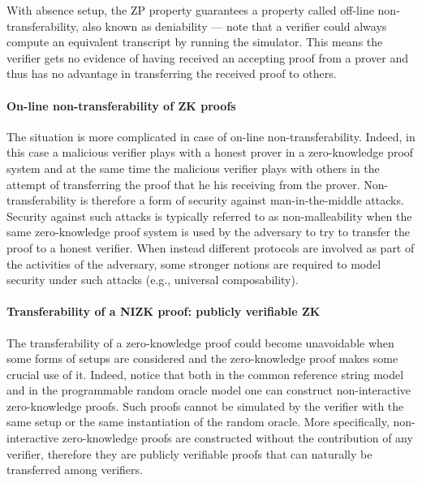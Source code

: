 With absence setup, the ZP property guarantees a property called off-line non-transfer\-ability, also known as deniability --- note that a verifier could always compute an equivalent transcript by running the simulator.
This means the verifier gets no evidence of having received an accepting proof from a prover and thus has no advantage in transferring the received proof to others.


\paragraph{On-line non-transferability of ZK proofs}
The situation is more complicated in case of on-line non-transferability.
Indeed, in this case a malicious verifier plays with a honest prover in a zero-knowledge proof system and at the same time the malicious verifier plays with others in the attempt of transferring the proof that he his receiving from the prover. 
Non-transferability is therefore a form of security against man-in-the-middle attacks. 
Security against such attacks is typically referred to as non-malleability when the same zero-knowledge proof system is used by the adversary to try to transfer the proof to a honest verifier. 
When instead different protocols are involved as part of the activities of the adversary, some stronger notions are required to model security under such attacks (e.g., universal composability).


\paragraph{Transferability of a NIZK proof: publicly verifiable ZK}
The transferability of a zero-knowledge proof could become unavoidable when some forms of setups are considered and the zero-knowledge proof makes some crucial use of it. 
Indeed, notice that both in the common reference string model and in the programmable random oracle model one can construct non-interactive zero-knowledge proofs. 
Such proofs cannot be simulated by the verifier with the same setup or the same instantiation of the random oracle. 
More specifically, non-interactive zero-knowledge proofs are constructed without the contribution of any verifier, therefore they are publicly verifiable proofs that can naturally be transferred among verifiers.


